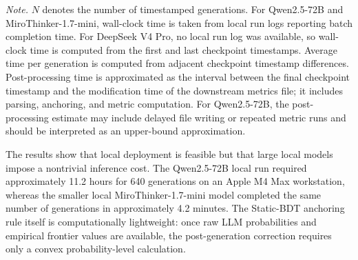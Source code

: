 \documentclass[11pt]{article}
\begin{document}
\begin{table}[htbp]
\centering
\caption{Runtime summary for full-scale unconstrained LLM generation.}
\label{tab:runtime_summary}

\vspace{0.3em}
\begin{minipage}{0.95\textwidth}
\small
\textit{Note.} \(N\) denotes the number of timestamped generations. For Qwen2.5-72B and MiroThinker-1.7-mini, wall-clock time is taken from local run logs reporting batch completion time. For DeepSeek V4 Pro, no local run log was available, so wall-clock time is computed from the first and last checkpoint timestamps. Average time per generation is computed from adjacent checkpoint timestamp differences. Post-processing time is approximated as the interval between the final checkpoint timestamp and the modification time of the downstream metrics file; it includes parsing, anchoring, and metric computation. For Qwen2.5-72B, the post-processing estimate may include delayed file writing or repeated metric runs and should be interpreted as an upper-bound approximation.
\end{minipage}
\end{table}

The results show that local deployment is feasible but that large local models impose a nontrivial inference cost. The Qwen2.5-72B local run required approximately 11.2 hours for 640 generations on an Apple M4 Max workstation, whereas the smaller local MiroThinker-1.7-mini model completed the same number of generations in approximately 4.2 minutes. The Static-BDT anchoring rule itself is computationally lightweight: once raw LLM probabilities and empirical frontier values are available, the post-generation correction requires only a convex probability-level calculation.
\end{document}
